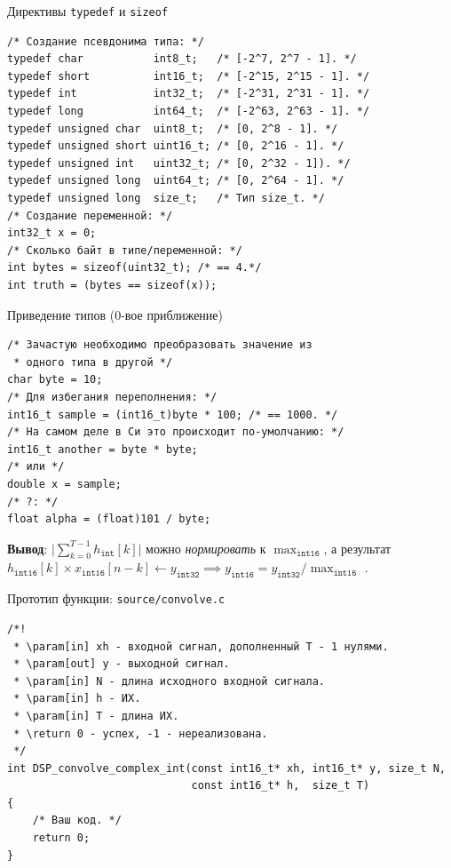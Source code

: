 \documentclass{beamer}
\begin{document}
    \begin{frame}[fragile]{Директивы \texttt{typedef} и \texttt{sizeof}}
        \begin{verbatim}
/* Создание псевдонима типа: */
typedef char           int8_t;   /* [-2^7, 2^7 - 1]. */
typedef short          int16_t;  /* [-2^15, 2^15 - 1]. */
typedef int            int32_t;  /* [-2^31, 2^31 - 1]. */
typedef long           int64_t;  /* [-2^63, 2^63 - 1]. */
typedef unsigned char  uint8_t;  /* [0, 2^8 - 1]. */
typedef unsigned short uint16_t; /* [0, 2^16 - 1]. */
typedef unsigned int   uint32_t; /* [0, 2^32 - 1]). */
typedef unsigned long  uint64_t; /* [0, 2^64 - 1]. */
typedef unsigned long  size_t;   /* Тип size_t. */
/* Создание переменной: */
int32_t x = 0;
/* Cколько байт в типе/переменной: */
int bytes = sizeof(uint32_t); /* == 4.*/
int truth = (bytes == sizeof(x));
        \end{verbatim}
    \end{frame}
    \begin{frame}[fragile]{Приведение типов (0-вое приближение)}
        \begin{verbatim}
/* Зачастую необходимо преобразовать значение из
 * одного типа в другой */
char byte = 10;
/* Для избегания переполнения: */
int16_t sample = (int16_t)byte * 100; /* == 1000. */
/* На самом деле в Си это происходит по-умолчанию: */
int16_t another = byte * byte;
/* или */
double x = sample;
/* ?: */
float alpha = (float)101 / byte;
        \end{verbatim}
        {\bf Вывод}: $\big\lvert\sum_{k=0}^{T-1}h_{\texttt{int}}[k]\big\rvert$ можно {\it нормировать} к $\max_{\texttt{int16}}$, а результат $h_{\texttt{int16}}[k] \times x_{\texttt{int16}}[n - k] \leftarrow y_{\texttt{int32}} \implies y_{\texttt{int16}} = y_{\texttt{int32}} / \max_{\texttt{int16}}$ . 
    \end{frame}
    \begin{frame}[fragile]{Прототип функции: {\tt source/convolve.c}}
        \begin{verbatim}
/*!
 * \param[in] xh - входной сигнал, дополненный T - 1 нулями.
 * \param[out] y - выходной сигнал.
 * \param[in] N - длина исходного входной сигнала.
 * \param[in] h - ИХ.
 * \param[in] T - длина ИХ.
 * \return 0 - успех, -1 - нереализована.
 */
int DSP_convolve_complex_int(const int16_t* xh, int16_t* y, size_t N, 
                             const int16_t* h,  size_t T)
{
    /* Ваш код. */
    return 0;
}
        \end{verbatim}
    \end{frame}
\end{document}
